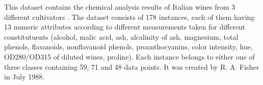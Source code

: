 
This dataset contains the chemical analysis results of Italian wines from 3 different cultivators \cite{winedata}. 
The dataset consists of 178 instances, each of them having 13 numeric attributes according to different measurements taken for different constitutuents (alcohol, malic acid, ash, alcalinity of ash, magnesium, total phenols, flavanoids, nonflavanoid phenols, proanthocyanins, color intensity, hue, OD280/OD315 of diluted wines, proline). Each instance belongs to either one of three classes containing 59, 71 and 48 data points. 
It was created by R. A. Fisher in July 1988. 